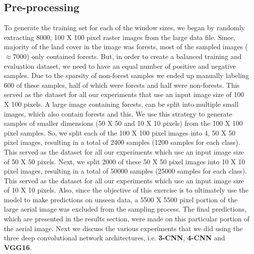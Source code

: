 \documentclass{sigkddExp}
\begin{document}
\subsection{Pre-processing}
To generate the training set for each of the window sizes, we began by randomly extracting 8000, 100 X 100 pixel raster images from the large data file. Since, majority of the land cover in the image was forests, most of the sampled images ($\approx 7000$) only contained forests. But, in order to create a balanced training and evaluation dataset, we need to have an equal number of positive and negative samples. Due to the sparsity of non-forest samples we ended up manually labeling 600 of these samples, half of which were forests and half were non-forests. This served as the dataset for all our experiments that use an input image size of 100 X 100 pixels. A large image containing forests, can be split into multiple small images, which also contain forests and this. We use this strategy to generate samples of smaller dimensions (50 X 50 and 10 X 10 pixels) from the 100 X 100 pixel samples. So, we split each of the 100 X 100 pixel images into 4, 50 X 50 pixel images, resulting in a total of 2400 samples (1200 samples for each class). This served as the dataset for all our experiments which use an input image size of 50 X 50 pixels. Next, we split 2000 of these 50 X 50 pixel images into 10 X 10 pixel images, resulting in a total of 50000 samples (25000 samples for each class). This served as the dataset for all our experiments which use an input image size of 10 X 10 pixels. Also, since the objective of this exercise is to ultimately use the model to make predictions on unseen data, a 5500 X 5500 pixel portion of the large aerial image was excluded from the sampling process. The final predictions, which are presented in the results section, were made on this particular portion of the aerial image. Next we discuss the various experiments that we did using the three deep convolutional network architectures, i.e. \textbf{3-CNN}, \textbf{4-CNN} and \textbf{VGG16}.  
\end{document}
